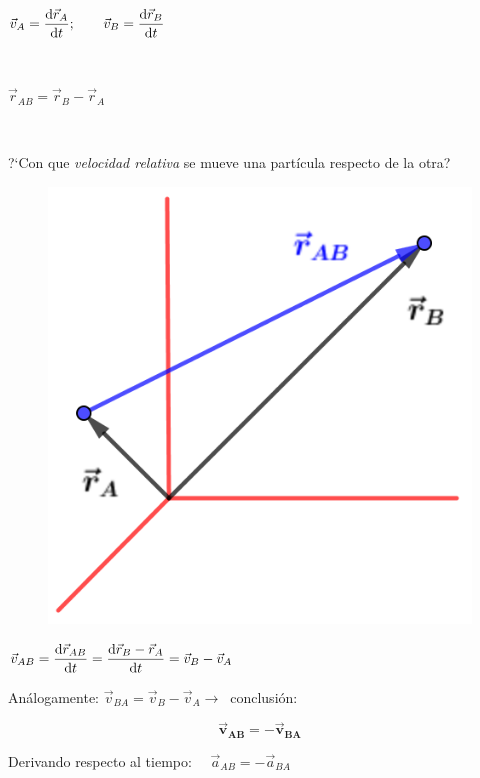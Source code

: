 \begin{multicols}{2}
	
$\displaystyle \vec v_A=\dv{\vec r_A}{t}; \qquad \vec v_B=\dv{\vec r_B}{t}$

$\quad$

$\vec r_{AB}=\vec r_B-\vec r_A$

$\quad$

?`Con que \emph{velocidad relativa} se mueve una partícula respecto de la otra?


\begin{figure}[H]
	\centering
	\includegraphics[width=.35\textwidth]{imagenes/imagenes10/T10IM01.png}
\end{figure}	
\end{multicols}

$\vec v_{AB}=\displaystyle \dv{\vec r_{AB}}{t}=\dv{\vec r_B-\vec r_A}{t}=\vec v_B-\vec v_A$

Análogamente: $\vec v_{BA}=\vec v_B-\vec v_A \to\ $ conclusión: 

\begin{equation}
\boldsymbol{ \vec v_{AB}=-\vec v_{BA} }	
\end{equation}

Derivando respecto al tiempo: $\quad \vec a_{AB}=-\vec a_{BA}$

